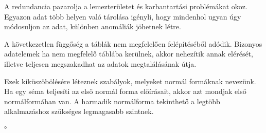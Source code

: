 A redundancia pazarolja a lemezterületet és karbantartási problémákat okoz. Egyazon adat több helyen való tárolása igényli, hogy mindenhol ugyan úgy módosuljon az adat, különben anomáliák jöhetnek létre.

A következetlen függőség a táblák nem megfelelően felépítéséből adódik. Bizonyos adatelemek ha nem megfelelő táblába kerülnek, akkor nehezítik annak elérését, illetve teljesen megszakadhat az adatok megtalálásának útja.

Ezek kiküszöbölésére léteznek szabályok, melyeket normál formáknak nevezünk. Ha egy séma teljesíti az első normál forma előírásait, akkor azt mondjak első normálformában van. A harmadik normálforma tekinthető a legtöbb alkalmazáshoz szükséges legmagasabb szintnek.

°%



